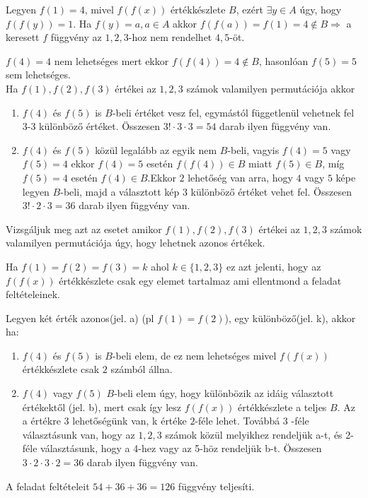\begin{solution}
	Legyen $f(1)=4$, mivel $f(f(x))$ értékkészlete $B$, ezért $\exists y\in A$
	úgy, hogy $f(f(y))=1$. Ha $f(y)=a,a\in A$ akkor $f(f(a))=f(1)=4\notin B\Rightarrow$
	a keresett $f$ függvény az $1,2,3$-hoz nem rendelhet $4,5$-öt.
	
	$f(4)=4$ nem lehetséges mert ekkor $f(f(4))=4\notin B$, hasonlóan
	$f(5)=5$ sem lehetséges.\\
	
	Ha $f(1),f(2),f(3)$ értékei az $1,2,3$ számok valamilyen permutációja
	akkor 
	\begin{enumerate}
		\item $f(4)$ és $f(5)$ is $B$-beli értéket vesz fel, egymástól függetlenül
		vehetnek fel 3-3 különböző értéket. Összesen $3!\cdot3\cdot3=54$
		darab ilyen függvény van. 
		\item $f(4)$ és $f(5)$ közül legalább az egyik nem $B$-beli, vagyis $f(4)=5$
		vagy $f(5)=4$ ekkor $f(4)=5$ esetén $f(f(4))\in B$ miatt $f(5)\in B$,
		míg $f(5)=4$ esetén $f(4)\in B$.Ekkor $2$ lehetőség van arra, hogy
		$4$ vagy $5$ képe legyen $B$-beli, majd a választott kép $3$ különböző
		értéket vehet fel. Összesen $3!\cdot2\cdot3=36$ darab ilyen függvény
		van. 
	\end{enumerate}
	Vizsgáljuk meg azt az esetet amikor $f(1),f(2),f(3)$ értékei az $1,2,3$
	számok valamilyen permutációja úgy, hogy lehetnek azonos értékek.
	
	Ha $f(1)=f(2)=f(3)=k$ ahol $k\in\{1,2,3\}$ ez azt jelenti, hogy
	az $f(f(x))$ értékkészlete csak egy elemet tartalmaz ami ellentmond
	a feladat feltételeinek.
	
	Legyen két érték azonos(jel. a) (pl $f(1)=f(2)$), egy különböző(jel.
	k), akkor ha: 
	\begin{enumerate}
		\item $f(4)$ és $f(5)$ is $B$-beli elem, de ez nem lehetséges mivel $f(f(x))$
		értékkészlete csak $2$ számból állna. 
		\item $f(4)$ vagy $f(5)$ $B$-beli elem úgy, hogy különbözik az idáig
		választott értékektől (jel. b), mert csak így lesz $f(f(x))$ értékkészlete
		a teljes $B$. Az a értékre $3$ lehetőségünk van, k értéke $2$-féle
		lehet. Továbbá $3$ -féle választásunk van, hogy az $1,2,3$ számok
		közül melyikhez rendeljük a-t, és 2-féle választásunk, hogy a 4-hez
		vagy az 5-höz rendeljük b-t. Összesen $3\cdot2\cdot3\cdot2=36$ darab
		ilyen függvény van. 
	\end{enumerate}
	A feladat feltételeit $54+36+36=126$ függvény teljesíti. 
\end{solution}
